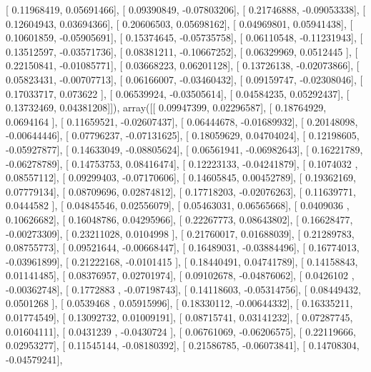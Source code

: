 \documentclass{article}
\begin{document}
       [ 0.11968419,  0.05691466],
       [ 0.09390849, -0.07803206],
       [ 0.21746888, -0.09053338],
       [ 0.12604943,  0.03694366],
       [ 0.20606503,  0.05698162],
       [ 0.04969801,  0.05941438],
       [ 0.10601859, -0.05905691],
       [ 0.15374645, -0.05735758],
       [ 0.06110548, -0.11231943],
       [ 0.13512597, -0.03571736],
       [ 0.08381211, -0.10667252],
       [ 0.06329969,  0.0512445 ],
       [ 0.22150841, -0.01085771],
       [ 0.03668223,  0.06201128],
       [ 0.13726138, -0.02073866],
       [ 0.05823431, -0.00707713],
       [ 0.06166007, -0.03460432],
       [ 0.09159747, -0.02308046],
       [ 0.17033717,  0.073622  ],
       [ 0.06539924, -0.03505614],
       [ 0.04584235,  0.05292437],
       [ 0.13732469,  0.04381208]]), array([[ 0.09947399,  0.02296587],
       [ 0.18764929,  0.0694164 ],
       [ 0.11659521, -0.02607437],
       [ 0.06444678, -0.01689932],
       [ 0.20148098, -0.00644446],
       [ 0.07796237, -0.07131625],
       [ 0.18059629,  0.04704024],
       [ 0.12198605, -0.05927877],
       [ 0.14633049, -0.08805624],
       [ 0.06561941, -0.06982643],
       [ 0.16221789, -0.06278789],
       [ 0.14753753,  0.08416474],
       [ 0.12223133, -0.04241879],
       [ 0.1074032 ,  0.08557112],
       [ 0.09299403, -0.07170606],
       [ 0.14605845,  0.00452789],
       [ 0.19362169,  0.07779134],
       [ 0.08709696,  0.02874812],
       [ 0.17718203, -0.02076263],
       [ 0.11639771,  0.0444582 ],
       [ 0.04845546,  0.02556079],
       [ 0.05463031,  0.06565668],
       [ 0.0409036 ,  0.10626682],
       [ 0.16048786,  0.04295966],
       [ 0.22267773,  0.08643802],
       [ 0.16628477, -0.00273309],
       [ 0.23211028,  0.0104998 ],
       [ 0.21760017,  0.01688039],
       [ 0.21289783,  0.08755773],
       [ 0.09521644, -0.00668447],
       [ 0.16489031, -0.03884496],
       [ 0.16774013, -0.03961899],
       [ 0.21222168, -0.0101415 ],
       [ 0.18440491,  0.04741789],
       [ 0.14158843,  0.01141485],
       [ 0.08376957,  0.02701974],
       [ 0.09102678, -0.04876062],
       [ 0.0426102 , -0.00362748],
       [ 0.1772883 , -0.07198743],
       [ 0.14118603, -0.05314756],
       [ 0.08449432,  0.0501268 ],
       [ 0.0539468 ,  0.05915996],
       [ 0.18330112, -0.00644332],
       [ 0.16335211,  0.01774549],
       [ 0.13092732,  0.01009191],
       [ 0.08715741,  0.03141232],
       [ 0.07287745,  0.01604111],
       [ 0.0431239 , -0.0430724 ],
       [ 0.06761069, -0.06206575],
       [ 0.22119666,  0.02953277],
       [ 0.11545144, -0.08180392],
       [ 0.21586785, -0.06073841],
       [ 0.14708304, -0.04579241],
\end{document}
